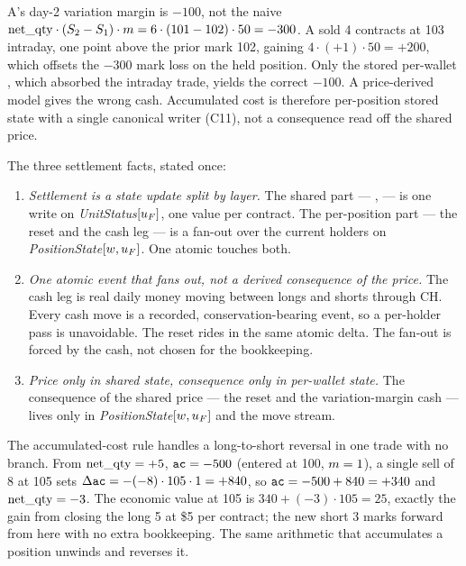 \begin{principle}
A's day-2 variation margin is $-100$, not the naive $\mathrm{net\_qty}\cdot(S_2-S_1)\cdot m =
6\cdot(101-102)\cdot 50 = -300$. A sold 4 contracts at 103 intraday, one point above the prior mark
102, gaining $4\cdot(+1)\cdot 50=+200$, which offsets the $-300$ mark loss on the held position. Only
the stored per-wallet \ac{}, which absorbed the intraday trade, yields the correct $-100$. A
price-derived model gives the wrong cash. Accumulated cost is therefore per-position stored state with
a single canonical writer (C11), not a consequence read off the shared price.
\end{principle}

\noindent The three settlement facts, stated once:
\begin{enumerate}
\item \emph{Settlement is a state update split by layer.} The shared part ---
,  --- is one write on
\emph{UnitStatus}$[u_{F}]$, one value per contract. The per-position part --- the \ac{} reset and the
cash leg --- is a fan-out over the current holders on \emph{PositionState}$[w,u_{F}]$. One atomic
 touches both.
\item \emph{One atomic event that fans out, not a derived consequence of the price.} The cash leg is
real daily money moving between longs and shorts through CH. Every cash move is a recorded,
conservation-bearing event, so a per-holder pass is unavoidable. The \ac{} reset rides in the same
atomic delta. The fan-out is forced by the cash, not chosen for the bookkeeping.
\item \emph{Price only in shared state, consequence only in per-wallet state.} The consequence of
the shared price --- the \ac{} reset and the variation-margin cash --- lives only in
\emph{PositionState}$[w,u_{F}]$ and the move stream.
\end{enumerate}

\begin{remark}
The accumulated-cost rule handles a long-to-short reversal in one trade with no branch. From
$\mathrm{net\_qty}=+5$, $\texttt{ac}=-500$ (entered at 100, $m=1$), a single sell of 8 at 105 sets
$\Delta\texttt{ac}=-(-8)\cdot 105\cdot 1=+840$, so $\texttt{ac}=-500+840=+340$ and $\mathrm{net\_qty}=-3$. The economic value at
105 is $340+(-3)\cdot 105 = 25$, exactly the gain from closing the long 5 at \$5 per contract; the new
short 3 marks forward from here with no extra bookkeeping. The same arithmetic that accumulates a
position unwinds and reverses it.
\end{remark}

